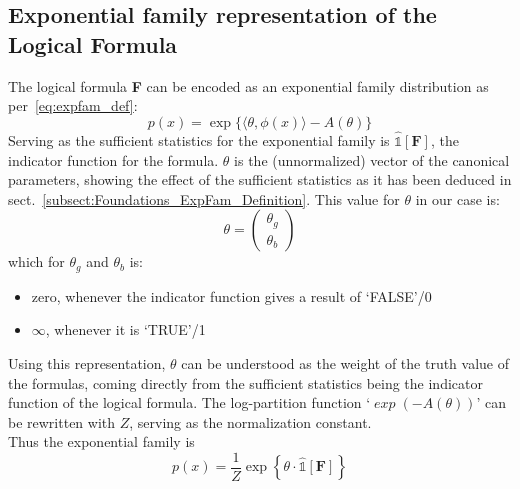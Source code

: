 \documentclass[encoding=utf8,british]{tumphthesis}
\begin{document}
        \subsection{Exponential family representation of the Logical Formula}
        \label{subsect:EE_expfam_repr}
            The logical formula \textbf{F} can be encoded as an exponential family distribution as per~\ref{eq:expfam_def}:
            \begin{equation*}
                p(x) = \exp \{ \langle \theta , \phi(x) \rangle - A(\theta) \}
            \end{equation*}
            Serving as the sufficient statistics for the exponential family is $\hat{\mathbb{1}}[\textbf{F}]$, the indicator function for 
            the formula. $\theta$ is the (unnormalized) vector of the canonical parameters, showing the effect of the sufficient statistics as it has been deduced in 
            sect.~\ref{subsect:Foundations_ExpFam_Definition}.
            This value for $\theta$ in our case is:
            \begin{equation*}
                \theta = \begin{pmatrix}
                    \theta_g \\
                    \theta_b 
                \end{pmatrix}
            \end{equation*}
            which for $\theta_g$ and $\theta_b$ is:
            \begin{itemize}
                \item zero, whenever the indicator function gives a result of `FALSE'/0
                \item $\infty$, whenever it is `TRUE'/1
            \end{itemize}
            Using this representation, $\theta$ can be understood as the weight of the truth value of the formulas, coming directly from the sufficient 
            statistics being the indicator function of the logical formula. The log-partition function `$\mathit{\exp(- A(\theta))}$' can be rewritten with $Z$,
            serving as the normalization constant.
            \\
            Thus the exponential family is
            \begin{equation}
                p(x) = \frac{1}{Z} \exp\left\{ \theta \cdot \hat{\mathbb{1}}[\textbf{F}] \right\}
                \label{eq:log_exp_fam}
            \end{equation}
            
\end{document}
